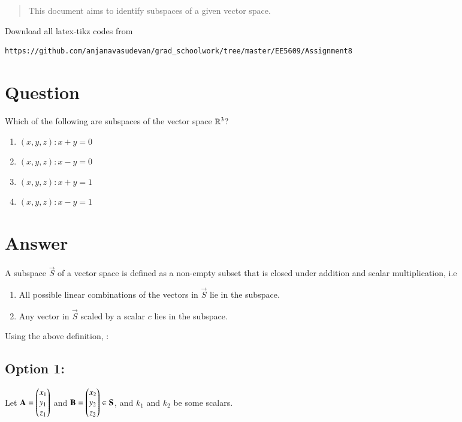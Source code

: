 \documentclass[journal,12pt,twocolumn]{IEEEtran}
\begin{document}
%
\maketitle
\begin{abstract}
This document aims to identify subspaces of a given vector space.
\end{abstract}
Download all latex-tikz codes from
%
\begin{lstlisting}
https://github.com/anjanavasudevan/grad_schoolwork/tree/master/EE5609/Assignment8
\end{lstlisting}
%
\section{Question}
Which of the following are subspaces of the vector space $\mathbb{R}^3$?
\begin{enumerate}
  \item ${(x, y, z):x + y = 0}$
  \item ${(x, y, z):x - y = 0}$
  \item ${(x, y, z):x + y = 1}$
  \item ${(x, y, z):x - y = 1}$
\end{enumerate}
\section{Answer}
A subspace $\vec{S}$ of a vector space is defined as a non-empty subset that is closed under addition and scalar multiplication, i.e
\begin{enumerate}
  \item All possible linear combinations of the vectors in $\vec{S}$ lie in the subspace.
  \item Any vector in $\vec{S}$ scaled by a scalar $c$ lies in the subspace.
\end{enumerate}
Using the above definition, :
\subsection{Option 1:}
Let $\mathbf{A} = \begin{pmatrix}x_1 \\ y_1 \\ z_1\end{pmatrix}$ and $\mathbf{B} = \begin{pmatrix}x_2 \\ y_2 \\ z_2\end{pmatrix} \in \mathbf{S}$, and $k_1$ and $k_2$ be some scalars.
\end{document}

